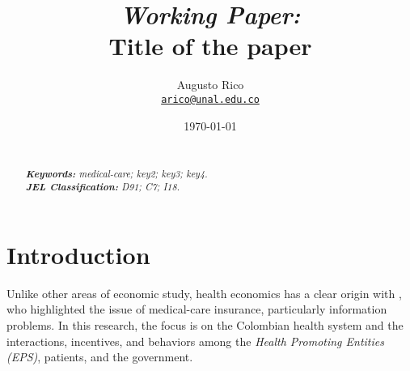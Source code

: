 \documentclass[11pt]{article}
\title{\textit{Working Paper:} \\ %
    Title of the paper %
}
\author{Augusto Rico\\
    \href{mailto:arico@unal.edu.co}{\texttt{arico@unal.edu.co}}
    }
\date{\today}
\begin{document}
{ %
\maketitle
\begin{abstract}
\noindent\lipsum[2] %
~\\
\textit{\textbf{Keywords: }%
medical-care; key2; key3; key4.} \\ %
\textit{\textbf{JEL Classification: }%
D91; C7; I18.} %
\end{abstract}}




\section{Introduction}
\begin{flushleft}
    Unlike other areas of economic study, health economics has a clear origin with \citet{arrow1963uncertainty}, who highlighted the issue of medical-care insurance, particularly information problems. In this research, the focus is on the Colombian health system and the interactions, incentives, and behaviors among the \textit{Health Promoting Entities (EPS)}, patients, and the government.
\end{flushleft}


\newpage

\medskip

\nocite{*}
\printbibliography
\newpage
\end{document}

